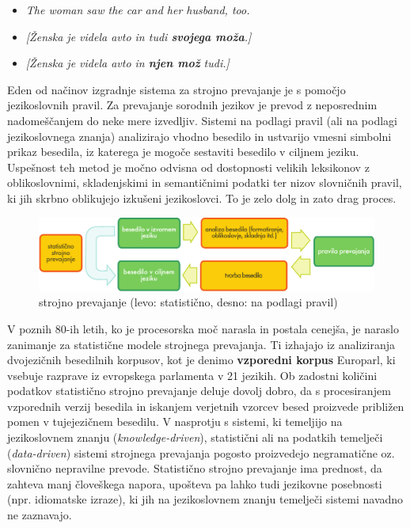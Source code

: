 \begin{multicols}{2}
\begin{itemize}
\item \textit{The woman saw the car and her husband, too.} 
\item \textit{{[}Ženska je videla avto in tudi \textbf{svojega moža}.{]}}
\item \textit{{[}Ženska je videla avto in \textbf{njen mož} tudi.{]}}
\end{itemize}

Eden od načinov izgradnje sistema za strojno prevajanje je s pomočjo jezikoslovnih pravil. Za prevajanje sorodnih jezikov je prevod z neposrednim nadomeščanjem do neke mere izvedljiv. Sistemi na podlagi pravil (ali na podlagi jezikoslovnega znanja) analizirajo vhodno besedilo in ustvarijo vmesni simbolni prikaz besedila, iz katerega je mogoče sestaviti besedilo v ciljnem jeziku. Uspešnost teh metod je močno odvisna od dostopnosti velikih leksikonov z oblikoslovnimi, skladenjskimi in semantičnimi podatki ter nizov slovničnih pravil, ki jih skrbno oblikujejo izkušeni jezikoslovci. To je zelo dolg in zato drag proces.

\begin{figure}[htb]
  \center
  \includegraphics[width=\textwidth]{../_media/slovene/machine_translation}
  \caption{strojno prevajanje (levo: statistično, desno: na podlagi pravil)}
  \label{fig:mtarch_de}
\end{figure}

V poznih 80-ih letih, ko je procesorska moč narasla in postala cenejša, je naraslo zanimanje za statistične modele strojnega prevajanja. Ti izhajajo iz analiziranja dvojezičnih besedilnih korpusov, kot je denimo \textbf{vzporedni korpus} Europarl, ki vsebuje razprave iz evropskega parlamenta v 21 jezikih. Ob zadostni količini podatkov statistično strojno prevajanje deluje dovolj dobro, da s procesiranjem vzporednih verzij besedila in iskanjem verjetnih vzorcev besed proizvede približen pomen v tujejezičnem besedilu. V nasprotju s sistemi, ki temeljijo na jezikoslovnem znanju (\textit{knowledge-driven}), statistični ali na podatkih temelječi (\textit{data-driven}) sistemi strojnega prevajanja pogosto proizvedejo negramatične oz. slovnično nepravilne prevode. Statistično strojno prevajanje ima prednost, da zahteva manj človeškega napora, upošteva pa lahko tudi jezikovne posebnosti (npr. idiomatske izraze), ki jih na jezikoslovnem znanju temelječi sistemi navadno ne zaznavajo.


\end{multicols}
